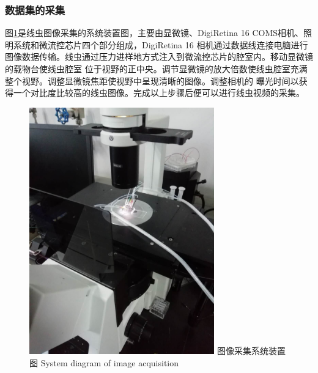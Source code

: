 \subsubsection{数据集的采集}
	图\ref{fig:chap5:camera}是线虫图像采集的系统装置图，主要由显微镜、DigiRetina 16 COMS相机、照明系统和微流控芯片四个部分组成，DigiRetina 16
	相机通过数据线连接电脑进行图像数据传输。线虫通过压力进样地方式注入到微流控芯片的腔室内。移动显微镜的载物台使线虫腔室
	位于视野的正中央。调节显微镜的放大倍数使线虫腔室充满整个视野。调整显微镜焦距使视野中呈现清晰的图像。调整相机的
	曝光时间以获得一个对比度比较高的线虫图像。完成以上步骤后便可以进行线虫视频的采集。
	\begin{figure}[thb]
	  \centering
	  \includegraphics[width=8cm]{figure/chap5/camera.jpg}
	  \bicaption
		{图像采集系统装置图}
		{System diagram of image acquisition}
	  \label{fig:chap5:camera}
	\end{figure}
